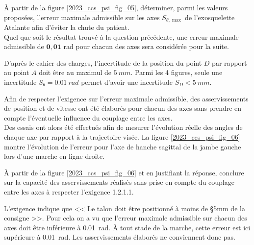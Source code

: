 \begin{question}%
\label{2023_ccs_psi_q_04}
À partir de la figure \ref{2023_ccs_psi_fig_05}, déterminer, parmi les valeurs proposées, l'erreur maximale admissible sur les axes $S_{\theta, \max }$ de l'exosquelette Atalante afin d'éviter la chute du patient.\\
Quel que soit le résultat trouvé à la question précédente, une erreur maximale admissible de $\mathbf{0 , 0 1}$ rad pour chacun des axes sera considérée pour la suite.\\
\end{question}
\ifprof
\begin{corrige}
D'après le cahier des charges, l'incertitude de la position du point
$D$ par rapport au point  $A$  doit être au maximul de $\SI{5}{mm}$. Parmi les 4 figures, seule une incertitude $S_{\theta}=\SI{0,01}{rad}$ permet d'avoir une incertitude $S_D < \SI{5}{mm}$.

\end{corrige}
\else
\fi


Afin de respecter l'exigence sur l'erreur maximale admissible, des asservissements de position et de vitesse ont été élaborés pour chacun des axes sans prendre en compte l'éventuelle influence du couplage entre les axes.\\
Des essais ont alors été effectués afin de mesurer l'évolution réelle des angles de chaque axe par rapport à la trajectoire visée. La figure \ref{2023_ccs_psi_fig_06} montre l'évolution de l'erreur pour l'axe de hanche sagittal de la jambe gauche lors d'une marche en ligne droite.\\

\begin{question}%
\label{2023_ccs_psi_q_05}
À partir de la figure \ref{2023_ccs_psi_fig_06} et en justifiant la réponse, conclure sur la capacité des asservissements réalisés sans prise en compte du couplage entre les axes à respecter l'exigence 1.2.1.1.
\end{question}
\ifprof
\begin{corrige}
L'exigence indique que << Le talon doit être positionné à moins de
\S{5}{mm} de la consigne >>. Pour cela on a vu que l'erreur maximale admissible sur chacun des axes doit être inférieure à \SI{0,01}{rad}. À tout stade de la marche, cette erreur est ici supérieure à \SI{0,01}{rad}. Les asservissements élaborés ne conviennent donc pas.

\end{corrige}
\else
\fi



